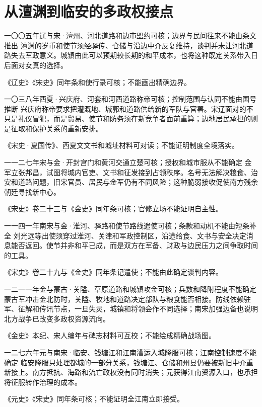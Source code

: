 \section{从澶渊到临安的多政权接点}
\begin{event}{}{一〇〇五年}{辽与宋·澶州、河北道路和边市}{盟约可核；边界与民间往来不能由条文推出}
澶渊的岁币和使节须经驿传、仓储与沿边中介反复维持，谈判并未让河北道路失去军政意义。城镇由此可以预期较长期的和平成本，也将这种既定关系带入日后面对女真的选择。

《辽史》《宋史》同年条和使行录可核；不能画出精确边界。
\end{event}
\begin{event}{}{一〇三八年}{西夏·兴庆府、河套和河西道路}{称帝可核；控制范围与认同不能由国号推断}
兴庆府称帝要求把灌溉地、城郭和道路供给新的军队与官署。宋辽面对的不只是礼仪冒犯，而是贸易、使节和防务须在新竞争者面前重算；边地居民承担的则是征取和保护关系的重新安排。

《宋史·夏国传》、西夏文文书和城址材料可对读；不能证明制度全境落实。
\end{event}
\begin{event}{}{一一二七年}{宋与金·开封宫门和黄河交通}{立楚可核；授权和城市服从不能确定}
金军立张邦昌，试图将城内官吏、文书和征发接到占领秩序。名号无法解决粮食、治安和道路问题，旧宋官员、居民与金军仍有不同风险；这种脆弱接收促使南方残余朝廷寻找新中心。

《宋史》卷二十三与《金史》同年条可核；官修立场不能证明自主性。
\end{event}
\begin{event}{}{一一四一年}{南宋与金·淮河、驿路和使节路线}{遣使可核；条款和动机不能由短条补全}
刘光远等出使须穿过淮河、关津和军政控制区，沿途给食、文书与安全决定消息能否返回。使节并非和平已成，而是双方在军备、财政与边民压力之间争取时间的工具。

《宋史》卷二十九与《金史》同年条记遣使；不能由此确定谈判内容。
\end{event}
\begin{event}{}{一二一一年}{金与蒙古·关隘、草原道路和城镇}{攻金可核；兵数和降附程度不能确定}
蒙古军冲击金北防时，关隘、牧地和道路决定部队与粮食能否相接。防线依赖驻军、征解和传讯节点，一旦失灵，城镇和将领会作不同选择；南宋加强边备也说明北方战争已改变多政权资源流向。

《金史》本纪、宋人编年与碑志材料可互校；不能绘成精确战场图。
\end{event}
\begin{event}{}{一二七六年}{元与南宋·临安、钱塘江和江南漕运}{入城降服可核；江南控制速度不能确定}
临安降服只处理都城的一部分关系，钱塘江、仓储和州县仍要被新旧中介重新接上。南方抵抗、海路和流亡政权没有同时消失；元获得江南资源入口，也承担将征服转作治理的成本。

《元史》《宋史》同年条可核；不能证明全江南立即接受。
\end{event}


